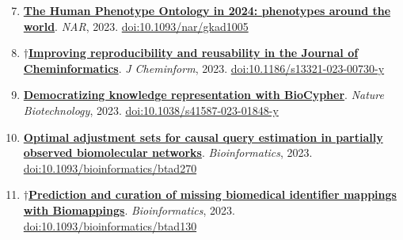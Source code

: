 \documentclass[10pt,a4paper,sans]{moderncv} %
\newcommand{\wikidata}[2]{\href{https://bioregistry.io/wikidata:#1?provider=scholia}{{#2}}}
\begin{document}
    \begin{enumerate}
    \setcounter{enumi}{6}
    \itemsep0.5em
        \item
        \wikidata{Q123608235}{\textbf{The Human Phenotype Ontology in 2024: phenotypes around the world}}.
    \textit{NAR}, 2023.  {\scriptsize \href{https://bioregistry.io/doi:10.1093/NAR/GKAD1005}{doi:10.1093/nar/gkad1005}}
        \item
        $\dagger$\wikidata{Q120200936}{\textbf{Improving reproducibility and reusability in the Journal of Cheminformatics}}.
    \textit{J Cheminform}, 2023.  {\scriptsize \href{https://bioregistry.io/doi:10.1186/S13321-023-00730-Y}{doi:10.1186/s13321-023-00730-y}}
        \item
        \wikidata{Q119813997}{\textbf{Democratizing knowledge representation with BioCypher}}.
    \textit{Nature Biotechnology}, 2023.  {\scriptsize \href{https://bioregistry.io/doi:10.1038/S41587-023-01848-Y}{doi:10.1038/s41587-023-01848-y}}
        \item
        \wikidata{Q122028693}{\textbf{Optimal adjustment sets for causal query estimation in partially observed biomolecular networks}}.
    \textit{Bioinformatics}, 2023.  {\scriptsize \href{https://bioregistry.io/doi:10.1093/BIOINFORMATICS/BTAD270}{doi:10.1093/bioinformatics/btad270}}
        \item
        $\dagger$\wikidata{Q118774152}{\textbf{Prediction and curation of missing biomedical identifier mappings with Biomappings}}.
    \textit{Bioinformatics}, 2023.  {\scriptsize \href{https://bioregistry.io/doi:10.1093/BIOINFORMATICS/BTAD130}{doi:10.1093/bioinformatics/btad130}}
    \end{enumerate}
\end{document}
